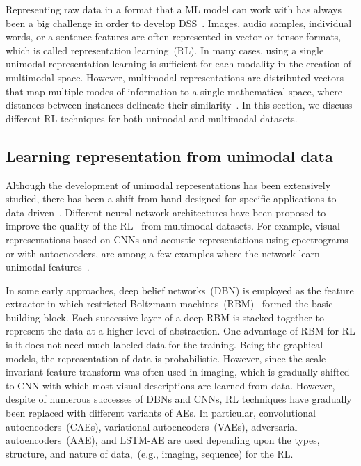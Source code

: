 \hspace*{3.5mm}Representing raw data in a format that a ML model can work with has always been a big challenge in order to develop DSS~\cite{mmsurvey}. Images, audio samples, individual words, or a sentence features are often represented in vector or tensor formats, which is called representation learning~(RL). In many cases, using a single unimodal representation learning is sufficient for each modality in the creation of multimodal space. However, multimodal representations are distributed vectors that map multiple modes of information to a single mathematical space, where distances between instances delineate their similarity~\cite{ito2018effects}. 
In this section, we discuss different RL techniques for both unimodal and multimodal datasets. 

\subsection{Learning representation from unimodal data}
Although the development of unimodal representations has been extensively studied, there has been a shift from hand-designed for specific applications to data-driven~\cite{mmsurvey}. Different neural network architectures have been proposed to improve the quality of the RL~\cite{min2018survey} from multimodal datasets. For example, visual representations based on CNNs and acoustic representations using epectrograms or with autoencoders, are among a few examples where the network learn unimodal features~\cite{ito2018effects}. 

\hspace*{3.5mm} In some early approaches, deep belief networks~(DBN) is employed as the feature extractor in which restricted Boltzmann machines~(RBM)~\cite{jaitly2011learning} formed the basic building block. Each successive layer of a deep RBM is stacked together to represent the data at a higher level of abstraction. One advantage of RBM for RL is it does not need much labeled data for the training. Being the graphical models, the representation of data is probabilistic. 
However, since the scale invariant feature transform was often used in imaging, which is gradually shifted to CNN with which most visual descriptions are learned from data.
However, despite of numerous successes of DBNs and CNNs, RL techniques have gradually been replaced with different variants of AEs. In particular, convolutional autoencoders~(CAEs), variational autoencoders~(VAEs), adversarial autoencoders~(AAE), and LSTM-AE are used depending upon the types, structure, and nature of data,~(e.g., imaging, sequence) for the RL. 

